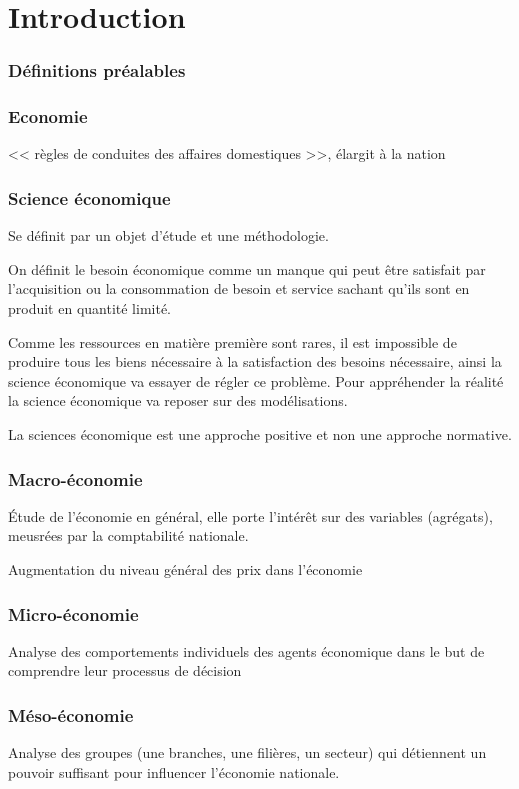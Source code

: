 \chapter*{Introduction}	
\subsection{Définitions préalables}
	\subsection{Economie}
		<< règles de conduites des affaires domestiques >>, élargit à la nation
		\subsection{Science économique}
		Se définit par un objet d'étude et une méthodologie.

	On définit le besoin économique comme un manque qui peut être satisfait par l'acquisition ou la consommation de besoin et service sachant qu'ils
	sont en produit en quantité limité.

	Comme les ressources en matière première sont rares, il est impossible de produire tous les biens nécessaire à la satisfaction des besoins
	nécessaire, ainsi la science économique va essayer de régler ce problème. Pour appréhender la réalité la science économique va reposer sur des
	modélisations.

	La sciences économique est une approche positive et non une approche normative.

	\subsection{Macro-économie}
	Étude de l'économie en général, elle porte l'intérêt sur des variables (agrégats), meusrées par la comptabilité nationale. 
	\begin{exemple}
		Augmentation du niveau général des prix dans l'économie	
	\end{exemple}
	\subsection{Micro-économie}
	Analyse des comportements individuels des agents économique dans le but de comprendre leur processus de décision
	\subsection{Méso-économie}
	Analyse des groupes (une branches, une filières, un secteur) qui détiennent un pouvoir suffisant pour influencer l'économie nationale.

